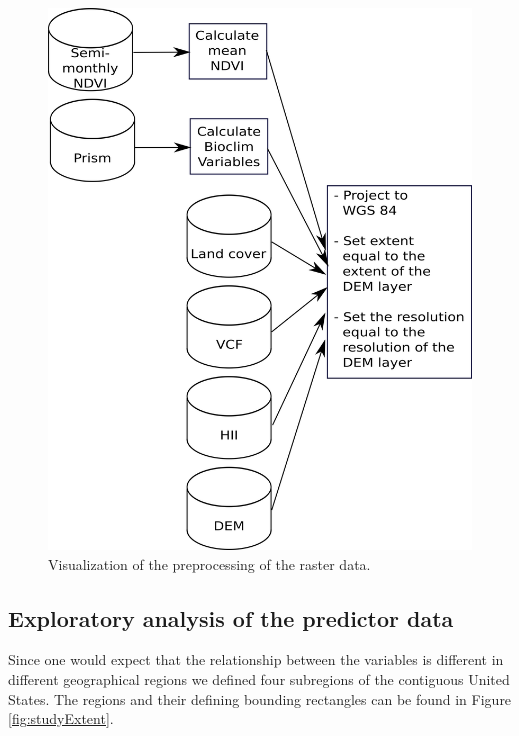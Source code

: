 \begin{figure}[!htb]
\centering
\includegraphics[scale=0.35]{VectorGraphics/DataScheme.png}
\caption{\label{fig:DataCommonlyUsedInSpeciesDistributionModels:DataScheme}Visualization of the preprocessing of the raster data.}
\end{figure}


\subsection{Exploratory analysis of the predictor data}
\label{sec:ExploratoryPredictor}

Since one would expect that the relationship between the variables is different in different geographical regions we defined four subregions of the contiguous United States. The regions and their defining bounding rectangles can be found in Figure \ref{fig:studyExtent}. \\


